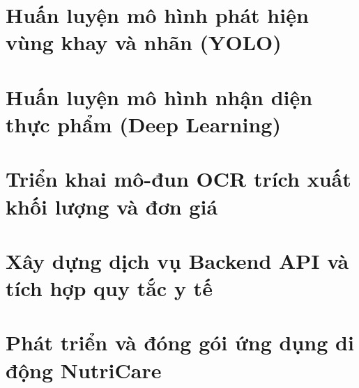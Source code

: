\section{Huấn luyện mô hình phát hiện vùng khay và nhãn (YOLO)}
\section{Huấn luyện mô hình nhận diện thực phẩm (Deep Learning)}
\section{Triển khai mô-đun OCR trích xuất khối lượng và đơn giá}
\section{Xây dựng dịch vụ Backend API và tích hợp quy tắc y tế}
\section{Phát triển và đóng gói ứng dụng di động NutriCare}